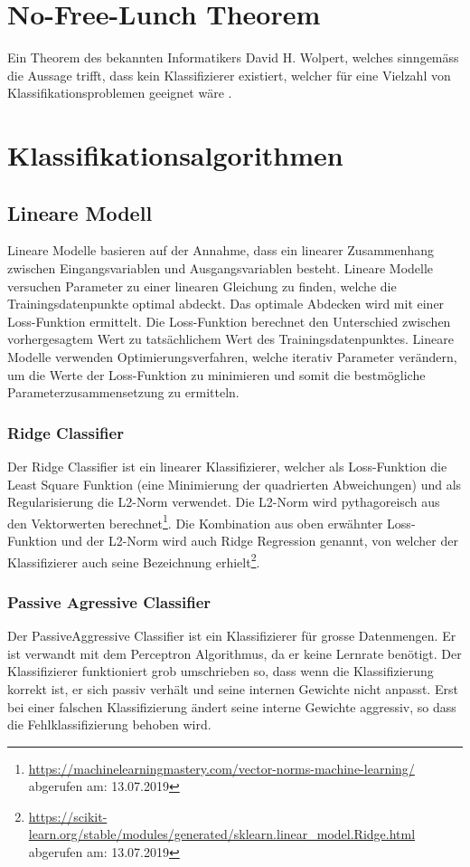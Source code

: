 \section{No-Free-Lunch Theorem}\label{sec:nofreelunch}
Ein Theorem des bekannten Informatikers David H. Wolpert, welches sinngemäss die Aussage trifft, dass kein Klassifizierer existiert, welcher für eine Vielzahl von Klassifikationsproblemen geeignet wäre \cite{Wolpert1996TheLO}.

\section{Klassifikationsalgorithmen}\label{sec:algos}
\subsection{Lineare Modell}
Lineare Modelle basieren auf der Annahme, dass ein linearer Zusammenhang zwischen Eingangsvariablen und Ausgangsvariablen besteht.
Lineare Modelle versuchen Parameter zu einer linearen Gleichung zu finden, welche die Trainingsdatenpunkte optimal abdeckt.
Das optimale Abdecken wird mit einer Loss-Funktion ermittelt.
Die Loss-Funktion berechnet den Unterschied zwischen vorhergesagtem Wert zu tatsächlichem Wert des Trainingsdatenpunktes.
Lineare Modelle verwenden Optimierungsverfahren, welche iterativ Parameter verändern, um die Werte der Loss-Funktion zu minimieren und somit die bestmögliche Parameterzusammensetzung zu ermitteln.
\subsubsection{Ridge Classifier}
Der Ridge Classifier ist ein linearer Klassifizierer, welcher als Loss-Funktion die \glqq Least Square\grqq{} Funktion (eine Minimierung der quadrierten Abweichungen) und als Regularisierung die L2-Norm verwendet. Die L2-Norm wird pythagoreisch aus den Vektorwerten berechnet\footnote{\url{https://machinelearningmastery.com/vector-norms-machine-learning/} abgerufen am: 13.07.2019}.
Die Kombination aus oben erwähnter Loss-Funktion und der L2-Norm wird auch \glqq Ridge Regression\grqq{} genannt, von welcher der Klassifizierer auch seine Bezeichnung erhielt\footnote{\url{https://scikit-learn.org/stable/modules/generated/sklearn.linear_model.Ridge.html} abgerufen am: 13.07.2019}\cite{scikit-learn}.
\subsubsection{Passive Agressive Classifier}
Der PassiveAggressive Classifier ist ein Klassifizierer für grosse Datenmengen.
Er ist verwandt mit dem Perceptron Algorithmus, da er keine Lernrate benötigt.
Der Klassifizierer funktioniert grob umschrieben so, dass wenn die Klassifizierung korrekt ist, er sich passiv verhält und seine internen Gewichte nicht anpasst.
Erst bei einer falschen Klassifizierung ändert seine interne Gewichte aggressiv, so dass die Fehlklassifizierung behoben wird\cite{crammer2006online}.
